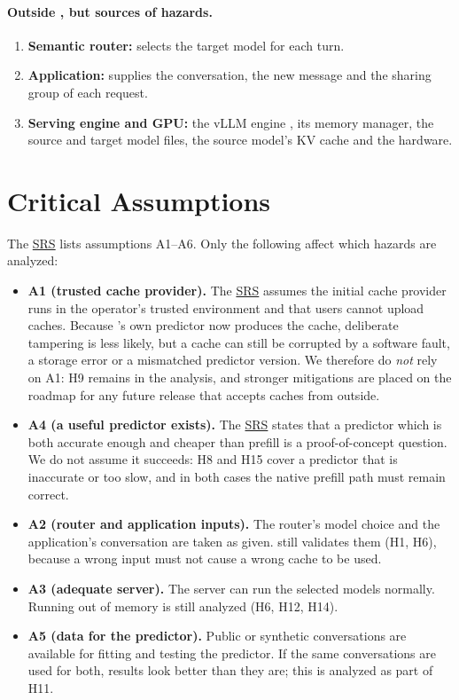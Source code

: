 \documentclass{article}
\newcommand{\srs}{\href{../SRS-Volere/SRS.pdf}{SRS}}
\begin{document}
\paragraph{Outside \progname{}, but sources of hazards.}
\begin{enumerate}[resume*]
  \item \label{comp:router} \textbf{Semantic router:} selects the target
  model for each turn.
  \item \label{comp:app} \textbf{Application:} supplies the conversation,
  the new message and the sharing group of each request.
  \item \label{comp:engine} \textbf{Serving engine and GPU:} the vLLM
  engine \cite{Kwon2023vLLM}, its memory manager, the source and target
  model files, the source model's KV cache and the hardware.
\end{enumerate}

\section{Critical Assumptions}
\label{sec:assumptions}

The \srs{} lists assumptions A1--A6. Only the following affect which
hazards are analyzed:

\begin{itemize}
  \item \textbf{A1 (trusted cache provider).} The \srs{} assumes the
  initial cache provider runs in the operator's trusted environment and
  that users cannot upload caches. Because \progname{}'s own predictor now
  produces the cache, deliberate tampering is less likely, but a cache can
  still be corrupted by a software fault, a storage error or a mismatched
  predictor version. We therefore do \emph{not} rely on A1: H9 remains in
  the analysis, and stronger mitigations are placed on the roadmap for any
  future release that accepts caches from outside.
  \item \textbf{A4 (a useful predictor exists).} The \srs{} states that a
  predictor which is both accurate enough and cheaper than prefill is a
  proof-of-concept question. We do not assume it succeeds: H8 and H15
  cover a predictor that is inaccurate or too slow, and in both cases the
  native prefill path must remain correct.
  \item \textbf{A2 (router and application inputs).} The router's model
  choice and the application's conversation are taken as given. \progname{}
  still validates them (H1, H6), because a wrong input must not cause a
  wrong cache to be used.
  \item \textbf{A3 (adequate server).} The server can run the selected
  models normally. Running out of memory is still analyzed (H6, H12, H14).
  \item \textbf{A5 (data for the predictor).} Public or synthetic
  conversations are available for fitting and testing the predictor. If
  the same conversations are used for both, results look better than they
  are; this is analyzed as part of H11.
\end{itemize}
\end{document}
